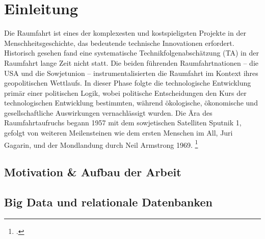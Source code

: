 \section{Einleitung}

Die Raumfahrt ist eines der komplexesten und kostspieligsten Projekte in der Menschheitsgeschichte, das bedeutende technische Innovationen erfordert. Historisch gesehen fand eine systematische Technikfolgenabschätzung (TA) in der Raumfahrt lange Zeit nicht statt. Die beiden führenden Raumfahrtnationen – die USA und die Sowjetunion – instrumentalisierten die Raumfahrt im Kontext ihres geopolitischen Wettlaufs. In dieser Phase folgte die technologische Entwicklung primär einer politischen Logik, wobei politische Entscheidungen den Kurs der technologischen Entwicklung bestimmten, während ökologische, ökonomische und gesellschaftliche Auswirkungen vernachlässigt wurden. Die Ära des Raumfahrtaufruchs begann 1957 mit dem sowjetischen Satelliten Sputnik 1, gefolgt von weiteren Meilensteinen wie dem ersten Menschen im All, Juri Gagarin, und der Mondlandung durch Neil Armstrong 1969. \footcite{adamsAnhalterDurchGalaxis2013}


\subsection{Motivation \& Aufbau der Arbeit}

\subsection{Big Data und relationale Datenbanken}







